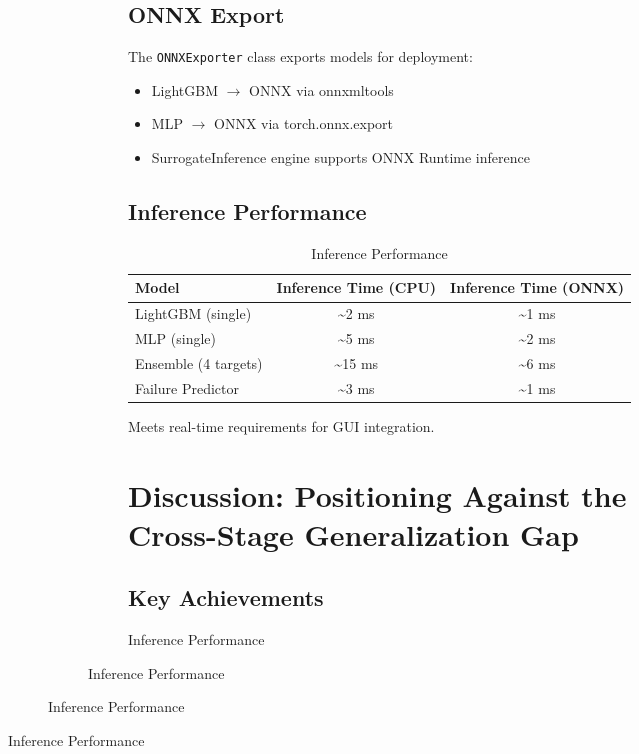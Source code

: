 \documentclass[10pt,conference]{IEEEtran}
\begin{document}
\begin{figure}[t]
\begin{figure}[t]
\begin{figure}[t]
\begin{subfigure}{0.48\linewidth}
\subsection{ONNX Export}

The \texttt{ONNXExporter} class exports models for deployment:
\begin{itemize}
    \item LightGBM $\rightarrow$ ONNX via onnxmltools
    \item MLP $\rightarrow$ ONNX via torch.onnx.export
    \item SurrogateInference engine supports ONNX Runtime inference
\end{itemize}

\subsection{Inference Performance}

\begin{table}[t]
\centering
\caption{Inference Performance}
\label{tab:inference_perf}
\begin{tabular}{@{}lcc@{}}
\toprule
Model & Inference Time (CPU) & Inference Time (ONNX) \\
\midrule
LightGBM (single) & \textasciitilde 2 ms & \textasciitilde 1 ms \\
MLP (single) & \textasciitilde 5 ms & \textasciitilde 2 ms \\
Ensemble (4 targets) & \textasciitilde 15 ms & \textasciitilde 6 ms \\
Failure Predictor & \textasciitilde 3 ms & \textasciitilde 1 ms \\
\bottomrule
\end{tabular}
\end{table}

Meets real-time requirements for GUI integration.


\section{Discussion: Positioning Against the Cross-Stage Generalization Gap}
\label{sec:discussion}

\subsection{Key Achievements}


\end{subfigure}
\end{figure}
\end{figure}
\end{figure}
\end{document}
